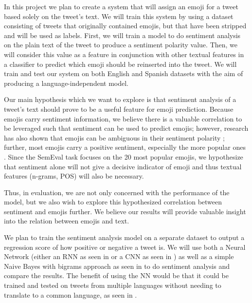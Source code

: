 \documentclass[10pt]{article}
\begin{document}



In this project we plan to create a system that will assign an emoji for a tweet based solely on the tweet's text. We will train this system by using a dataset consisting of tweets that originally contained emojis, but that have been stripped and will be used as labels. First, we will train a model to do sentiment analysis on the plain text of the tweet to produce a sentiment polarity value. Then, we will consider this value as a feature in conjunction with other textual features in a classifier to predict which emoji should be reinserted into the tweet. We will train and test our system on both English and Spanish datasets with the aim of producing a language-independent model.

Our main hypothesis which we want to explore is that sentiment analysis of a tweet's text should prove to be a useful feature for emoji prediction. Because emojis carry sentiment information, we believe there is a valuable correlation to be leveraged such that sentiment can be used to predict emojis; however, research has also shown that emojis can be ambiguous in their sentiment polarity \cite{miller2016blissfully}; further, most emojis carry a positive sentiment, especially the more popular ones \cite{novak2015sentiment}. Since the SemEval task focuses on the 20 most popular emojis, we hypothesize that sentiment alone will not give a decisive indicator of emoji and thus textual features (n-grams, POS) will also be necessary.

Thus, in evaluation, we are not only concerned with the performance of the model, but we also wish to explore this hypothesized correlation between sentiment and emojis further. We believe our results will provide valuable insight into the relation between emojis and text.

We plan to train the sentiment analysis model on a separate dataset to output a regression score of how positive or negative a tweet is. We will use both a Neural Network (either an RNN as seen in \cite{rozental2017amobee} or a CNN as seen in \cite{wehrmann2017character}) as well as a simple Naive Bayes with bigrams approach as seen in \cite{pak2010twitter} to do sentiment analysis and compare the results. The benefit of using the NN would be that it could be trained and tested on tweets from multiple languages without needing to translate to a common language, as seen in \cite{wehrmann2017character}.   
\end{document}
